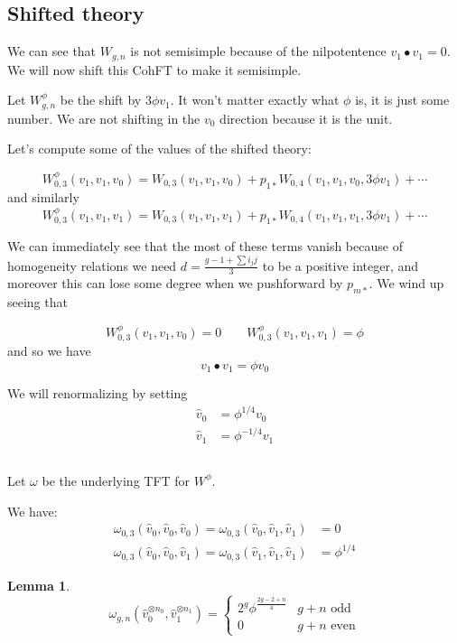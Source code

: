 \documentclass{amsart}
\theoremstyle{definition}
\newtheorem{lemma}{Lemma}
\begin{document}
\subsection{Shifted theory}

We can see that $W_{g,n}$ is not semisimple because of the nilpotentence $v_1\bullet v_1=0$.  We will now shift this CohFT to make it semisimple.

Let $W^\phi_{g,n}$ be the shift by $3\phi v_1$.  It won't matter exactly what $\phi$ is, it is just some number.  We are not shifting in the $v_0$ direction because it is the unit.

Let's compute some of the values of the shifted theory:

$$W^\phi_{0,3}(v_1, v_1,v_0)=W_{0,3}(v_1,v_1,v_0)+p_{1*}W_{0,4}(v_1,v_1,v_0, 3\phi v_1)+\cdots$$
and similarly
$$W^\phi_{0,3}(v_1, v_1,v_1)=W_{0,3}(v_1,v_1,v_1)+p_{1*}W_{0,4}(v_1,v_1,v_1, 3\phi v_1)+\cdots$$

We can immediately see that the most of these terms vanish because of homogeneity relations we need $d=\frac{g-1+\sum i_jj}{3}$ to be a positive integer, and moreover this can lose some degree when we pushforward by $p_{m*}$.  We wind up seeing that

$$W^\phi_{0,3}(v_1,v_1,v_0)=0\quad\quad W^\phi_{0,3}(v_1,v_1,v_1)=\phi$$
and so we have
$$v_1\bullet v_1=\phi v_0$$

We will renormalizing by setting 
\begin{align*}
\hat{v}_0&=\phi^{1/4}v_0 \\
\hat{v}_1 &= \phi^{-1/4} v_1
\end{align*}



\subsection{}
Let $\omega$ be the underlying TFT for $W^\phi$. 

We have:
\begin{align*}
\omega_{0,3}(\hat{v}_0, \hat{v}_0, \hat{v}_0)=\omega_{0,3}(\hat{v}_0,\hat{v}_1,\hat{v}_1)&=0\\
\omega_{0,3}(\hat{v}_0, \hat{v}_0, \hat{v}_1)=\omega_{0,3}(\hat{v}_1,\hat{v}_1,\hat{v}_1)&=\phi^{1/4}
\end{align*}

\begin{lemma}

$$\omega_{g,n}(\hat{v}_0^{\otimes n_0}, \hat{v}_1^{\otimes n_1})=\left\{\begin{array}{ll} 2^g \phi^{\frac{2g-2+n}{4}} & g+n \text{ odd} \\
0 & g+n \text{ even} 
  \end{array} \right.$$

\end{lemma}
\end{document}
